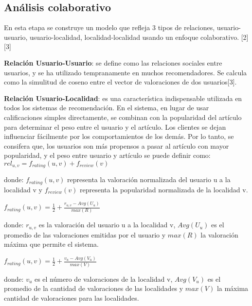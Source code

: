 \documentclass[runningheads]{llncs}
\begin{document}
\subsection{Análisis colaborativo}
En esta etapa se construye un modelo que refleja 3 tipos de relaciones, usuario-usuario, usuario-localidad, localidad-localidad usando un enfoque colaborativo. [2][3]

\textbf{Relación Usuario-Usuario}: se define como las relaciones sociales entre usuarios, y se ha utilizado tempranamente en muchos recomendadores. Se calcula como la simulitud de coseno entre el vector de valoraciones de dos usuarios[3].

\textbf{Relación Usuario-Localidad}: es una característica indispensable utilizada en todos los sistemas de recomendación. En el sistema, en lugar de usar calificaciones simples directamente, se combinan con la popularidad del artículo para determinar el peso entre el usuario y el artículo. Los clientes se dejan influenciar fácilmente por los comportamientos de los demás. Por lo tanto, se consifera que, los usuarios son más propensos a pasar al artículo con mayor popularidad, y el peso entre usuario y artículo se puede definir como: \\
$rel_{u,v} = f_{rating}(u,v) + f_{review}(v)$


donde: $f_{rating}(u,v)$ representa la valoración normalizada del usuario u a la localidad v y $f_{review}(v)$ representa la popularidad normalizada de la localidad v.

$f_{rating}(u,v) = \frac{1}{2} + \frac{r_{u,v} - Avg(U_u)}{max(R)}$


donde: $r_{u,v}$ es la valoración del usuario u a la localidad v, $Avg(U_u)$ es el promedio de las valoraciones emitidas por el usuario y $max(R)$ la valoración máxima que permite el sistema.

$f_{rating}(u,v) = \frac{1}{2} + \frac{v_u - Avg(V_u)}{max(V)}$

donde: $v_u$ es el número de valoraciones de la localidad v, $Avg(V_u)$ es el promedio de la cantidad de valoraciones de las localidades y $max(V)$ la máxima cantidad de valoraciones para las localidades.
\end{document}
